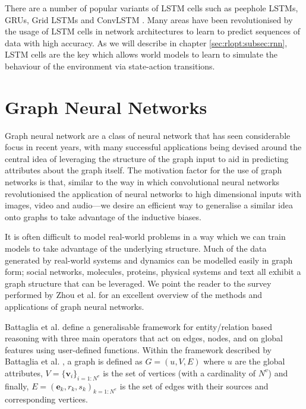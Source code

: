 There are a number of popular variants of LSTM cells such as peephole LSTMs, GRUs, Grid LSTMs and ConvLSTM \cite{yu2019review}. Many areas have been revolutionised by the usage of LSTM cells in network architectures to learn to predict sequences of data with high accuracy. As we will describe in chapter \ref{sec:rlopt:subsec:rnn}, LSTM cells are the key which allows world models to learn to simulate the behaviour of the environment via state-action transitions.

\section{Graph Neural Networks}

Graph neural network are a class of neural network that has seen considerable focus in recent years, with many successful applications being devised around the central idea of leveraging the structure of the graph input to aid in predicting attributes about the graph itself. The motivation factor for the use of graph networks is that, similar to the way in which convolutional neural networks revolutionised the application of neural networks to high dimensional inputs with images, video and audio---we desire an efficient way to generalise a similar idea onto graphs to take advantage of the inductive biases.

It is often difficult to model real-world problems in a way which we can train models to take advantage of the underlying structure. Much of the data generated by real-world systems and dynamics can be modelled easily in graph form; social networks, molecules, proteins, physical systems and text all exhibit a graph structure that can be leveraged. We point the reader to the survey performed by Zhou et al. \cite{zhou2020graph} for an excellent overview of the methods and applications of graph neural networks.

Battaglia et al. \cite{battaglia2018relational} define a generalisable framework for entity/relation based reasoning with three main operators that act on edges, nodes, and on global features using user-defined functions. Within the framework described by Battaglia et al. \cite{battaglia2018relational}, a graph is defined as $G = (u, V, E)$ where $u$ are the global attributes, $V = \lbrace \mathbf{v}_i \rbrace_{i={1:N^v}}$ is the set of vertices (with a cardinality of $N^v$) and finally, $E = {(\mathbf{e}_k, r_k, s_k)}_{k={1:N^e}}$ is the set of edges with their sources and corresponding vertices.



